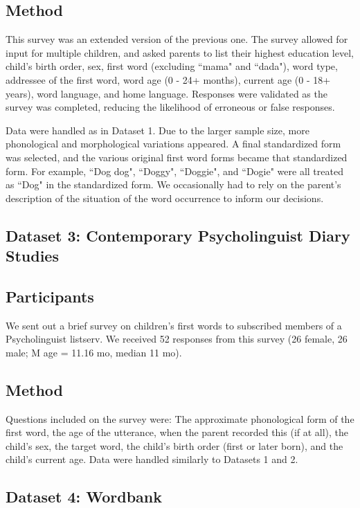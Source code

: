 \documentclass[10pt,letterpaper]{article}
\begin{document}
\subsection{Method}
This survey was an extended version of the previous one. The survey allowed for input for multiple children, and asked parents to list their highest education level, child's birth order, sex,  first word (excluding ``mama" and ``dada"), word type, addressee of the first word, word age (0 - 24+ months), current age (0 - 18+ years), word language, and home language.  Responses were validated as the survey was completed, reducing the likelihood of erroneous or false responses. 

Data were handled as in Dataset 1. Due to the larger sample size, more phonological and morphological variations appeared. A final standardized form was selected, and the various original first word forms became that standardized form. For example,  ``Dog dog", ``Doggy", ``Doggie", and ``Dogie" were all treated as ``Dog" in the standardized form. We occasionally had to rely on the parent's description of the situation of the word occurrence to inform our decisions.

\subsection{Dataset 3: Contemporary Psycholinguist Diary Studies}

\subsection{Participants}
We sent out a brief survey on children's first words to subscribed members of a Psycholinguist listserv. We received 52 responses from this survey (26 female, 26 male; M age = 11.16 mo, median 11 mo).

\subsection{Method}
Questions included on the survey were: The approximate phonological form of the first word, the age of the utterance, when the parent recorded this (if at all), the child's sex, the target word, the child's birth order (first or later born), and the child's current age. Data were handled similarly to Datasets 1 and 2. 

\subsection{Dataset 4: Wordbank}
\end{document}
